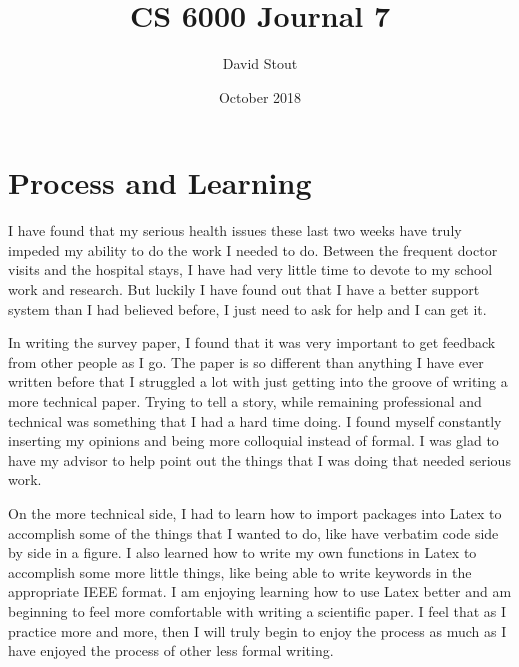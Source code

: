 \documentclass{article}
\title{CS 6000 Journal 7}
\author{David Stout}
\date{October 2018}
\begin{document}
\maketitle

\section{Process and Learning}
I have found that my serious health issues these last two weeks have truly impeded my ability to do the work I
needed to do. Between the frequent doctor visits and the hospital stays, I have had very little time to devote
to my school work and research. But luckily I have found out that I have a better support system than I had 
believed before, I just need to ask for help and I can get it.

In writing the survey paper, I found that it was very important to get feedback from other people as I go. The 
paper is so different than anything I have ever written before that I struggled a lot with just getting into the
groove of writing a more technical paper. Trying to tell a story, while remaining professional and technical was
something that I had a hard time doing. I found myself constantly inserting my opinions and being more 
colloquial instead of formal. I was glad to have my advisor to help point out the things that I was doing that 
needed serious work. 

On the more technical side, I had to learn how to import packages into Latex to accomplish some of the things
that I wanted to do, like have verbatim code side by side in a figure. I also learned how to write my own
functions in Latex to accomplish some more little things, like being able to write keywords in the appropriate
IEEE format. I am enjoying learning how to use Latex better and am beginning to feel more comfortable with
writing a scientific paper. I feel that as I practice more and more, then I will truly begin to enjoy the
process as much as I have enjoyed the process of other less formal writing.
\end{document}
